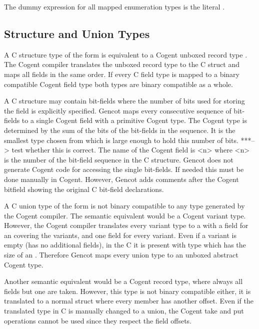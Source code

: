 The dummy expression for all mapped enumeration types is the literal .

\subsection{Structure and Union Types}
\label{design-types-struct}

A C structure type of the form  is equivalent to a Cogent unboxed record type .
The Cogent compiler translates the unboxed record type to the C struct and maps all fields in the same order.
If every C field type is mapped to a binary compatible Cogent field type both types are binary compatible as a whole.

A C structure may contain bit-fields where the number of bits used for storing the field is explicitly specified.
Gencot maps every consecutive sequence of bit-fields to a single Cogent field with a primitive Cogent type.
The Cogent type is determined by the sum of the bits of the bit-fields in the sequence. It is the smallest 
type chosen from  which is large enough to hold this number of bits. 
***--> test whether this is correct.
The name of the
Cogent field is <n> where <n> is the number of the bit-field sequence in the C structure.
Gencot does not generate Cogent code for accessing the single bit-fields. If needed this must be done manually in Cogent.
However, Gencot adds comments after the Cogent bitfield showing the original C bit-field declarations.

A C union type of the form  is not binary compatible to any type generated by the Cogent compiler.
The semantic equivalent would be a Cogent variant type. However, the Cogent compiler translates every variant type
to a  with a field for an  covering the variants, and one field for every variant. Even if a variant
is empty (has no additional fields), in the C  it is present with type  which
has the size of an . Therefore Gencot maps every union type to an unboxed abstract Cogent type.

Another semantic equivalent would be a Cogent record type, where always all fields but one are taken. However,
this type is not binary compatible either, it is translated to a normal struct where every member has another
offset. Even if the translated type in C is manually changed to a union, the Cogent take and put operations cannot
be used since they respect the field offsets. 

